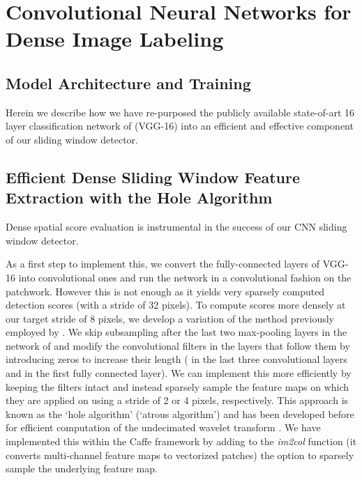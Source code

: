\section{Convolutional Neural Networks for Dense Image Labeling}
\label{sec:convnets}

\subsection{Model Architecture and Training}
\label{sec:convnet-arch}

Herein we describe how we have re-purposed the publicly available state-of-art
16 layer classification network of \cite{SiZi14} (VGG-16) into an efficient
and effective component of our sliding window detector.

\subsection{Efficient Dense Sliding Window Feature Extraction with the Hole Algorithm}
\label{sec:convnet-hole}

Dense spatial score evaluation is instrumental in the success of our CNN
sliding window detector. 

As a first step to implement this, we convert the fully-connected layers
of VGG-16 into convolutional ones and run the network in a convolutional
fashion on the patchwork. However this is not enough as it yields very
sparsely computed detection scores (with a stride of 32 pixels). To compute
scores more densely at our target stride of 8 pixels, we develop a variation
of the method previously employed by \cite{GCMG+13, SEZM+14}. We skip
subsampling after the last two max-pooling layers in the network of
\cite{SiZi14} and modify the convolutional filters in the layers that follow
them by introducing zeros to increase their length ( in the last three
convolutional layers and  in the first fully connected layer). We can
implement this more efficiently by keeping the filters intact and instead
sparsely sample the feature maps on which they are applied on using a stride
of 2 or 4 pixels, respectively. This approach is known as the `hole algorithm'
(`atrous algorithm') and has been developed before for efficient computation
of the undecimated wavelet transform \cite{Mall99}. We have implemented this
within the Caffe framework by adding to the \textsl{im2col} function (it
converts multi-channel feature maps to vectorized patches) the option to
sparsely sample the underlying feature map.

